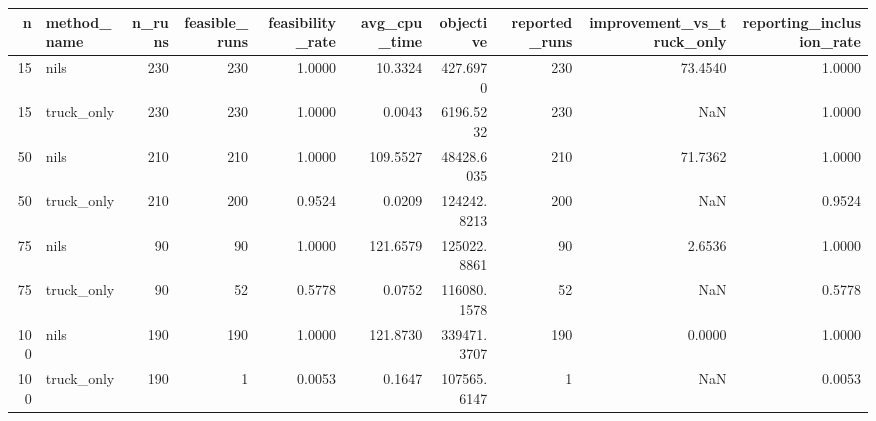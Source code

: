 \begin{tabular}{rlrrrrrrrr}
\toprule
n & method_name & n_runs & feasible_runs & feasibility_rate & avg_cpu_time & objective & reported_runs & improvement_vs_truck_only & reporting_inclusion_rate \\
\midrule
15 & nils & 230 & 230 & 1.0000 & 10.3324 & 427.6970 & 230 & 73.4540 & 1.0000 \\
15 & truck_only & 230 & 230 & 1.0000 & 0.0043 & 6196.5232 & 230 & NaN & 1.0000 \\
50 & nils & 210 & 210 & 1.0000 & 109.5527 & 48428.6035 & 210 & 71.7362 & 1.0000 \\
50 & truck_only & 210 & 200 & 0.9524 & 0.0209 & 124242.8213 & 200 & NaN & 0.9524 \\
75 & nils & 90 & 90 & 1.0000 & 121.6579 & 125022.8861 & 90 & 2.6536 & 1.0000 \\
75 & truck_only & 90 & 52 & 0.5778 & 0.0752 & 116080.1578 & 52 & NaN & 0.5778 \\
100 & nils & 190 & 190 & 1.0000 & 121.8730 & 339471.3707 & 190 & 0.0000 & 1.0000 \\
100 & truck_only & 190 & 1 & 0.0053 & 0.1647 & 107565.6147 & 1 & NaN & 0.0053 \\
\bottomrule
\end{tabular}
